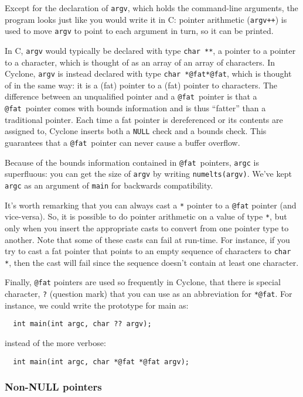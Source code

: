 Except for the declaration of \texttt{argv}, which holds the
command-line arguments, the program looks just like you would write it
in C: pointer arithmetic (\texttt{argv++}) is used to move
\texttt{argv} to point to each argument in turn, so it can be printed.

In C, \texttt{argv} would typically be declared with type \texttt{char
  **}, a pointer to a pointer to a character, which is thought of as
an array of an array of characters.  In Cyclone, \texttt{argv} is
instead declared with type \texttt{char *@fat*@fat}, which is thought of in
the same way: it is a (fat) pointer to a (fat) pointer to characters.  The
difference between an unqualified pointer and a \texttt{@fat}\ pointer is
that a \texttt{@fat}\ pointer comes with bounds information and is thus
``fatter'' than a traditional pointer.  Each time a
fat pointer is dereferenced or its contents are assigned to,
Cyclone inserts both a \texttt{NULL} check and a bounds check.  This
guarantees that a \texttt{@fat}\ pointer can never cause a buffer
overflow.

Because of the bounds information contained in \texttt{@fat}\ pointers,
\texttt{argc} is superfluous: you can get the size of \texttt{argv} by
writing \texttt{numelts(argv)}.  We've kept \texttt{argc} as an argument
of \texttt{main} for backwards compatibility.

It's worth remarking that you can always cast a \texttt{*} pointer
to a \texttt{@fat} pointer (and vice-versa).  So, it is possible to do
pointer arithmetic on a value of type \texttt{*}, but only when you
insert the appropriate casts to convert from one pointer type to 
another.  Note that some of these casts can fail at run-time.  For
instance, if you try to cast a fat pointer that points to an empty 
sequence of characters to \texttt{char *}, then the cast will fail
since the sequence doesn't contain at least one character. 

Finally, \texttt{@fat} pointers are used so frequently in Cyclone,
that there is special character, \texttt{?} (question mark) that you 
can use as an abbreviation for \texttt{*@fat}.  For instance, we could
write the prototype for main as:
\begin{verbatim}
  int main(int argc, char ?? argv);
\end{verbatim}
instead of the more verbose:
\begin{verbatim}
  int main(int argc, char *@fat *@fat argv);
\end{verbatim}

\subsubsection*{Non-NULL pointers}

